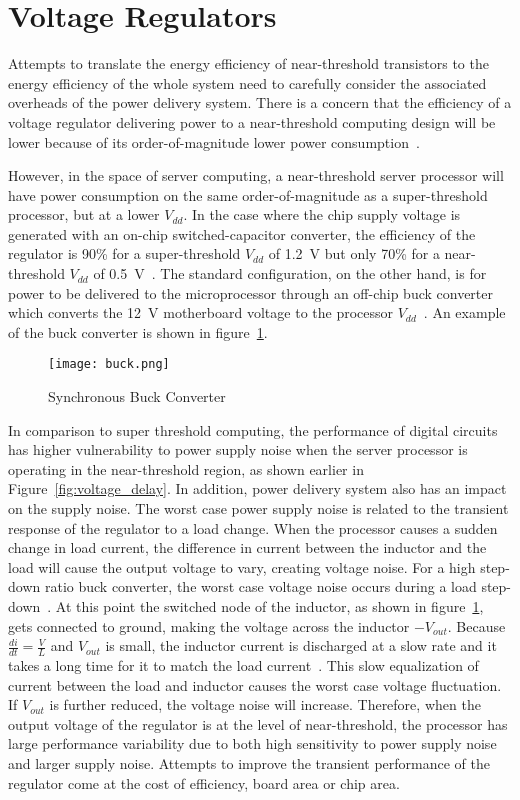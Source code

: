 \section{Voltage Regulators}

Attempts to translate the energy efficiency of near-threshold transistors to the energy efficiency of the whole system need to carefully consider the associated overheads of the power delivery system.
There is a concern that the efficiency of a voltage regulator delivering power to a near-threshold computing design will be lower because of its order-of-magnitude lower power consumption~\cite{ISLPED:2011}.

However, in the space of server computing, a near-threshold server processor will have power consumption on the same order-of-magnitude as a super-threshold processor, but at a lower $V_{dd}$.
In the case where the chip supply voltage is generated with an on-chip switched-capacitor converter, the efficiency of the regulator is 90\% for a super-threshold $V_{dd}$ of \SI{1.2}{\volt} but only 70\% for a near-threshold $V_{dd}$ of \SI{0.5}{\volt}~\cite{Pitfall:2010}.
The standard configuration, on the other hand, is for power to be delivered to the microprocessor through an off-chip buck converter which converts the \SI{12}{\volt} motherboard voltage to the processor $V_{dd}$~\cite{Server:2006}. An example of the buck converter is shown in figure~\ref{fig:buck}.

\begin{figure}[thpb]
\centering
\texttt{[image: buck.png]}
\label{fig:buck}
\caption{Synchronous Buck Converter}
\end{figure}

In comparison to super threshold computing, the performance of digital circuits has higher vulnerability to power supply noise when the server processor is operating in the near-threshold region, as shown earlier in Figure~\ref{fig:voltage_delay}. In addition, power delivery system also has an impact on the supply noise.
The worst case power supply noise is related to the transient response of the regulator to a load change.
When the processor causes a sudden change in load current, the difference in current between the inductor and the load will cause the output voltage to vary, creating voltage noise.
For a high step-down ratio buck converter, the worst case voltage noise occurs during a load step-down~\cite{Transient}.
At this point the switched node of the inductor, as shown in figure~\ref{fig:buck}, gets connected to ground, making the voltage across the inductor $-V_{out}$.
Because $\frac{di}{dt}=\frac{V}{L}$ and $V_{out}$ is small, the inductor current is discharged at a slow rate and it takes a long time for it to match the load current~\cite{g2010principles}.
This slow equalization of current between the load and inductor causes the worst case voltage fluctuation.
If $V_{out}$ is further reduced, the voltage noise will increase.
Therefore, when the output voltage of the regulator is at the level of near-threshold, the processor has large performance variability due to both high sensitivity to power supply noise and larger supply noise.
Attempts to improve the transient performance of the regulator come at the cost of efficiency, board area or chip area.


